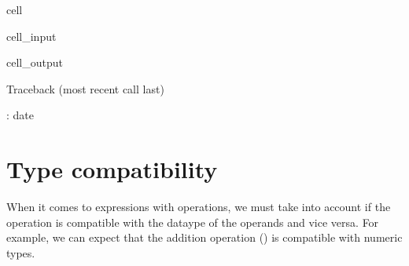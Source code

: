 \documentclass[letterpaper,10pt,english]{jupyterBook}
\begin{document}
\begin{sphinxuseclass}{cell}\begin{sphinxVerbatimInput}

\begin{sphinxuseclass}{cell_input}
\begin{sphinxVerbatim}[commandchars=\\\{\}]
\PYG{p}{[}\PYG{p}{]}
\end{sphinxVerbatim}

\end{sphinxuseclass}\end{sphinxVerbatimInput}
\begin{sphinxVerbatimOutput}

\begin{sphinxuseclass}{cell_output}
\begin{sphinxVerbatim}[commandchars=\\\{\}]
Traceback (most recent call last)
 \PYG{p}{[}\PYG{p}{]}  
 \PYG{p}{[}\PYG{p}{]}

: \PYGZsq{}date\PYGZsq{}
\end{sphinxVerbatim}

\end{sphinxuseclass}\end{sphinxVerbatimOutput}

\end{sphinxuseclass}

\section{Type compatibility}
\label{\detokenize{datatypes:type-compatibility}}
\sphinxAtStartPar
When it comes to expressions with operations, we must take into account if the operation is compatible with the dataype of the operands and vice versa. For example, we can expect that the addition operation (\sphinxcode{\sphinxupquote{+}}) is compatible with numeric types.
\end{document}
